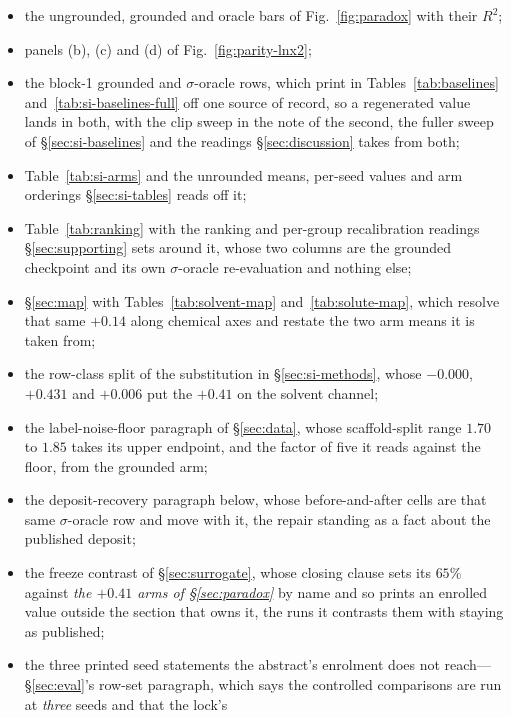 \begin{itemize}[leftmargin=1.15em,labelsep=0.4em,topsep=3pt,itemsep=2pt,parsep=0pt,partopsep=0pt]
carries it, and the $+0.41$ and $-0.20$ its third column prints, so that no cell of that row states a
seed policy the cell beside it contradicts;
\item the ungrounded, grounded and
oracle bars of Fig.~\ref{fig:paradox} with their $R^2$;
\item panels (b), (c) and (d) of
Fig.~\ref{fig:parity-lnx2};
\item the block-1 grounded and $\sigma$-oracle rows, which print in
Tables~\ref{tab:baselines} and~\ref{tab:si-baselines-full} off one source of record, so a regenerated
value lands in both, with the clip sweep in the note of the second, the fuller sweep of
\S\ref{sec:si-baselines} and the readings \S\ref{sec:discussion} takes from both;
\item Table~\ref{tab:si-arms} and the unrounded means, per-seed values and arm orderings
\S\ref{sec:si-tables} reads off it;
\item Table~\ref{tab:ranking} with the ranking and per-group
recalibration readings \S\ref{sec:supporting} sets around it, whose two columns are the grounded
checkpoint and its own $\sigma$-oracle re-evaluation and nothing else;
\item \S\ref{sec:map} with Tables~\ref{tab:solvent-map} and~\ref{tab:solute-map}, which resolve that same
$+0.14$ along chemical axes and restate the two arm means it is taken from;
\item the row-class split of
the substitution in \S\ref{sec:si-methods}, whose $-0.000$, $+0.431$ and $+0.006$ put the $+0.41$ on
the solvent channel;
\item the label-noise-floor paragraph of \S\ref{sec:data}, whose scaffold-split range
$1.70$ to $1.85$ takes its upper endpoint, and the factor of five it reads against the floor, from
the grounded arm;
\item the deposit-recovery paragraph below, whose before-and-after cells are that same
$\sigma$-oracle row and move with it, the repair standing as a fact about the published
deposit;
\item the freeze contrast of \S\ref{sec:surrogate}, whose closing clause sets its $65\%$ against
\emph{the $+0.41$ arms of \S\ref{sec:paradox}} by name and so prints an enrolled value
outside the section that owns it, the runs it contrasts them with staying as published;
\item the three
printed seed statements the abstract's enrolment does not reach---\S\ref{sec:eval}'s row-set
paragraph, which says the controlled comparisons are run at \emph{three} seeds and that the lock's

\end{itemize}
